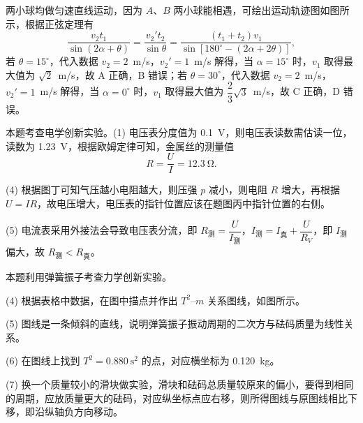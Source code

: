 \begin{answer}
两小球均做匀速直线运动，因为 $A$、$B$ 两小球能相遇，可绘出运动轨迹图如图所示，根据正弦定理有
\[
  \frac{v_{2}t_{1}}{\sin(2\alpha+\theta)}
  =\frac{v_{2}'t_{2}}{\sin\theta}
  =\frac{(t_{1}+t_{2})v_{1}}{\sin[180^{\circ}-(2\alpha+2\theta)]},
\]
若 $\theta=15^{\circ}$，代入数据 $v_{2}=2$~m/s，$v_{2}'=1$~m/s 解得，当 $\alpha=15^{\circ}$ 时，$v_{1}$ 取得最大值为 $\sqrt{2}$~m/s，故 A 正确，B 错误；若 $\theta=30^{\circ}$，代入数据 $v_{2}=2$~m/s，$v_{2}'=1$~m/s 解得，当 $\alpha=0^{\circ}$ 时，$v_{1}$ 取得最大值为 $\dfrac{2}{3}\sqrt{3}$~m/s，故 C 正确，D 错误。

\end{answer}

\begin{answer}
本题考查电学创新实验。(1) 电压表分度值为 \SI{0.1}{\volt}，则电压表读数需估读一位，读数为 \SI{1.23}{\volt}，根据欧姆定律可知，金属丝的测量值
\[
  R=\frac{U}{I}=\SI{12.3}{\ohm}.
\]

(4) 根据图丁可知气压越小电阻越大，则压强 $p$ 减小，则电阻 $R$ 增大，再根据 $U=IR$，故电压增大，电压表的指针位置应该在题图丙中指针位置的右侧。

(5) 电流表采用外接法会导致电压表分流，即 $R_{\text{测}}=\dfrac{U}{I_{\text{测}}}$，$I_{\text{测}}=I_{\text{真}}+\dfrac{U}{R_{V}}$，即 $I_{\text{测}}$ 偏大，故 $R_{\text{测}}<R_{\text{真}}$。
\end{answer}

\begin{answer}
本题利用弹簧振子考查力学创新实验。

(4) 根据表格中数据，在图中描点并作出 $T^{2}$--$m$ 关系图线，如图所示。


(5) 图线是一条倾斜的直线，说明弹簧振子振动周期的二次方与砝码质量为线性关系。

(6) 在图线上找到 $T^{2}=\SI{0.880}{\second\squared}$ 的点，对应横坐标为 \SI{0.120}{\kilogram}。

(7) 换一个质量较小的滑块做实验，滑块和砝码总质量较原来的偏小，要得到相同的周期，应放质量更大的砝码，对应纵坐标点应右移，则所得图线与原图线相比下移，即沿纵轴负方向移动。
\end{answer}

